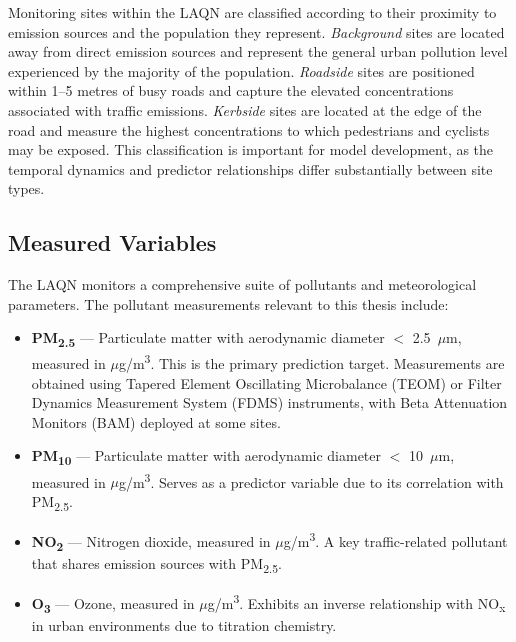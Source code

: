 Monitoring sites within the LAQN are classified according to their proximity to emission sources and the population they represent. \textit{Background} sites are located away from direct emission sources and represent the general urban pollution level experienced by the majority of the population. \textit{Roadside} sites are positioned within 1--5 metres of busy roads and capture the elevated concentrations associated with traffic emissions. \textit{Kerbside} sites are located at the edge of the road and measure the highest concentrations to which pedestrians and cyclists may be exposed. This classification is important for model development, as the temporal dynamics and predictor relationships differ substantially between site types.

\subsection{Measured Variables}
\label{subsec:variables}

The LAQN monitors a comprehensive suite of pollutants and meteorological parameters. The pollutant measurements relevant to this thesis include:

\begin{itemize}
    \item \textbf{PM\textsubscript{2.5}} --- Particulate matter with aerodynamic diameter $<$ 2.5~$\mu$m, measured in $\mu$g/m\textsuperscript{3}. This is the primary prediction target. Measurements are obtained using Tapered Element Oscillating Microbalance (TEOM) or Filter Dynamics Measurement System (FDMS) instruments, with Beta Attenuation Monitors (BAM) deployed at some sites.
    
    \item \textbf{PM\textsubscript{10}} --- Particulate matter with aerodynamic diameter $<$ 10~$\mu$m, measured in $\mu$g/m\textsuperscript{3}. Serves as a predictor variable due to its correlation with PM\textsubscript{2.5}.
    
    \item \textbf{NO\textsubscript{2}} --- Nitrogen dioxide, measured in $\mu$g/m\textsuperscript{3}. A key traffic-related pollutant that shares emission sources with PM\textsubscript{2.5}.
    
    \item \textbf{O\textsubscript{3}} --- Ozone, measured in $\mu$g/m\textsuperscript{3}. Exhibits an inverse relationship with NO\textsubscript{x} in urban environments due to titration chemistry.
\end{itemize}

